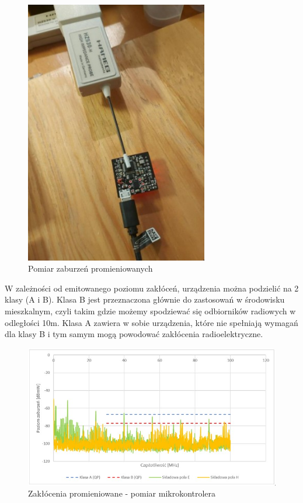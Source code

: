 \begin{figure}[H]
    \centering
    \includegraphics[width=8cm, angle=90]{Graphics/emc_hz530.jpg}
    \caption{Pomiar zaburzeń promieniowanych}
    \label{img:emc_hz530}
\end{figure}
W zależności od emitowanego poziomu zakłóceń, urządzenia można podzielić na 2 klasy (A i B). Klasa B jest przeznaczona głównie do zastosowań w środowisku mieszkalnym, czyli takim gdzie możemy spodziewać się odbiorników radiowych w odległości 10m. Klasa A zawiera w sobie urządzenia, które nie spełniają wymagań dla klasy B i tym samym mogą powodować zakłócenia radioelektryczne.

\begin{figure}[H]
    \centering
    \includegraphics[width=\textwidth, height=\textheight, keepaspectratio]{Graphics/emc_uc.jpg}
    \caption{Zakłócenia promieniowane - pomiar mikrokontrolera}
    \label{img:emc_uc}
\end{figure}


